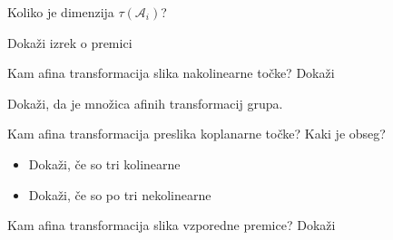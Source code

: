 \documentclass{article}
\begin{document}
\begin{enumerate}
\begin{itemize}
            {\color{red}\item Koliko je dimenzija $\tau (\mathcal{A}_i)$?}
        \end{itemize}
        \item Dokaži izrek o premici
        \item Kam afina transformacija slika nakolinearne točke? Dokaži
        \item Dokaži, da je množica afinih transformacij grupa.
        \item Kam afina transformacija preslika koplanarne točke? Kaki je obseg?
        \begin{itemize}
            \item Dokaži, če so tri kolinearne
            \item Dokaži, če so po tri nekolinearne
        \end{itemize}
        {\color{blue}\item Kam afina transformacija slika vzporedne premice? Dokaži}
    \end{enumerate}
\end{document}
